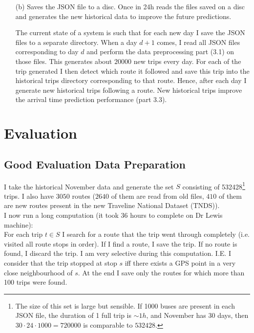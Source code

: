 \documentclass[12pt,a4paper,oneside,openright]{report}
\begin{document}
\begin{enumerate}
This is how for \textbf{each} bus I \textbf{independently} process its new GPS data
and predict the arrival time to the next bus stops. Currently one machine is
waiting for $t$ sec., then using the new GPS data to handle $50$ buses in 
$30 - t$ sec.\footnote{Of course, I am trying to minimise $t$ and maximise the number of buses
handled $30 - t$ sec.}

\item[(b)] Saves the JSON file to a disc. Once in 24h reads the files saved on a disc
and generates the new historical data to improve the future predictions.

The current state of a system is such that for each new day I save the JSON files
to a separate directory. When a day $d+1$ comes, I read all JSON files corresponding
to day $d$ and perform the data preprocessing part (3.1) on those files. This generates
about $20000$ new trips every day. For each of the trip generated I then detect
which route it followed and save this trip into the historical trips directory
corresponding to that route. Hence, after each day I generate new historical trips
following a route. New historical trips improve the arrival time prediction
performance (part 3.3).

\end{enumerate}

\chapter{Evaluation}

\section{Good Evaluation Data Preparation}


I take the historical November data and generate the set $S$ consisting of 532428\footnote{
The size of this set is large but sensible. If 1000 buses are present in each JSON file,
the duration of 1 full trip is $\sim1h$, and November has 30 days, 
then $30 \cdot 24 \cdot 1000 = 720000$ is comparable to $532428$.} trips. I also have $3050$ routes
($2640$ of them are read from old files, $410$ of them are new routes present
in the new Traveline National Dataset (TNDS)). \\

I now run a long computation (it took 36 hours to complete on Dr Lewis machine): \\

For each trip $t \in S$ I search for a route that the trip went through completely (i.e. visited
all route stops in order). If I find a route, I save the trip. If no route is found, I discard the
trip. I am very selective during this computation. I.E. I consider that the trip stopped at stop
$s$ iff there exists a GPS point in a very close neighbourhood of $s$. At the end I save only
the routes for which more than 100 trips were found. \\
\end{document}
